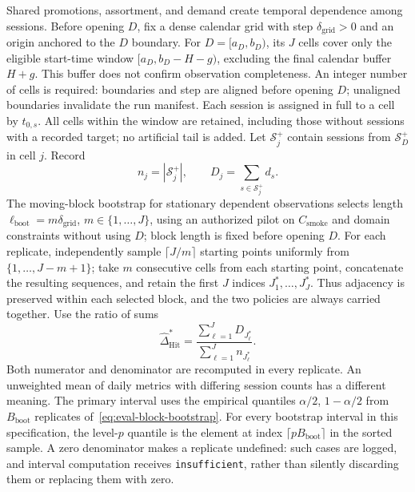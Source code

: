 \documentclass[12pt,a4paper]{article}
\theoremstyle{plainru}
\begin{document}
Shared promotions, assortment, and demand create temporal dependence among sessions.
Before opening $D$, fix a dense calendar grid with step
$\delta_{\mathrm{grid}}>0$ and an origin anchored to the $D$ boundary.
For $D=[a_D,b_D)$, its $J$ cells cover only the eligible
start-time window $[a_D,b_D-H-g)$, excluding the final calendar buffer $H+g$.
This buffer does not confirm observation completeness.
An integer number of cells is required: boundaries and step are aligned before opening $D$;
unaligned boundaries invalidate the run manifest.
Each session is assigned in full to a cell by $t_{0,s}$. All cells within the window
are retained, including those without sessions with a recorded target;
no artificial tail is added. Let $\mathcal S_j^+$ contain sessions
from $\mathcal S_D^+$ in cell $j$. Record
\begin{equation}\label{eq:eval-block-stat}
 n_j=|\mathcal S_j^+|,\qquad D_j=\sum_{s\in\mathcal S_j^+}d_s.
\end{equation}
The moving-block bootstrap
for stationary dependent observations
\cite{kunsch1989} selects length
$\ell_{\mathrm{boot}}=m\delta_{\mathrm{grid}}$, $m\in\{1,\ldots,J\}$,
using an authorized pilot on $C_{\mathrm{smoke}}$ and domain constraints
without using $D$; block length is fixed before opening $D$.
For each replicate, independently sample
$\lceil J/m\rceil$ starting points uniformly from $\{1,\ldots,J-m+1\}$;
take $m$ consecutive cells from each starting point, concatenate
the resulting sequences, and retain the first $J$ indices
$J_1^*,\ldots,J_J^*$. Thus adjacency is preserved within
each selected block, and the two policies are always carried together.
Use the ratio of sums
\begin{equation}\label{eq:eval-block-bootstrap}
 \widehat\Delta_{\mathrm{Hit}}^*
 =\frac{\sum_{\ell=1}^{J}D_{J_\ell^*}}
              {\sum_{\ell=1}^{J}n_{J_\ell^*}}.
\end{equation}
Both numerator and denominator are recomputed in every replicate.
An unweighted mean of daily metrics with differing session counts has a different meaning.
The primary interval uses the empirical quantiles $\alpha/2$, $1-\alpha/2$
from $B_{\mathrm{boot}}$ replicates of~\eqref{eq:eval-block-bootstrap}.
For every bootstrap interval in this specification, the level-$p$ quantile
is the element at index
$\lceil pB_{\mathrm{boot}}\rceil$ in the sorted sample.
A zero denominator makes a replicate undefined: such cases
are logged, and interval computation receives \texttt{insufficient},
rather than silently discarding them or replacing them with zero.
\end{document}
